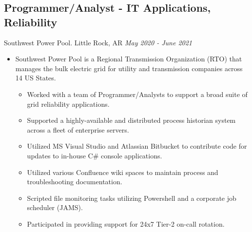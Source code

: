 \documentclass[11pt]{article}
\begin{document}
\subsection*{Programmer/Analyst - IT Applications, Reliability}
Southwest Power Pool. Little Rock, AR \hfill \textit{May 2020 - June 2021} \\
\begin{itemize}
	\item Southwest Power Pool is a Regional Transmission Organization (RTO) that manages the bulk electric grid for utility and transmission companies across 14 US States.
 \begin{itemize}
  \item Worked with a team of Programmer/Analysts to support a broad suite of grid reliability applications.
  \item Supported a highly-available and distributed process historian system across a fleet of enterprise servers.
  \item Utilized MS Visual Studio and Atlassian Bitbucket to contribute code for updates to in-house C\# console applications.
  \item Utilized various Confluence wiki spaces to maintain process and troubleshooting documentation.
  \item Scripted file monitoring tasks utilizing Powershell and a corporate job scheduler (JAMS).
  \item Participated in providing support for 24x7 Tier-2 on-call rotation.
 \end{itemize}
\end{itemize}
\\
\end{document}
